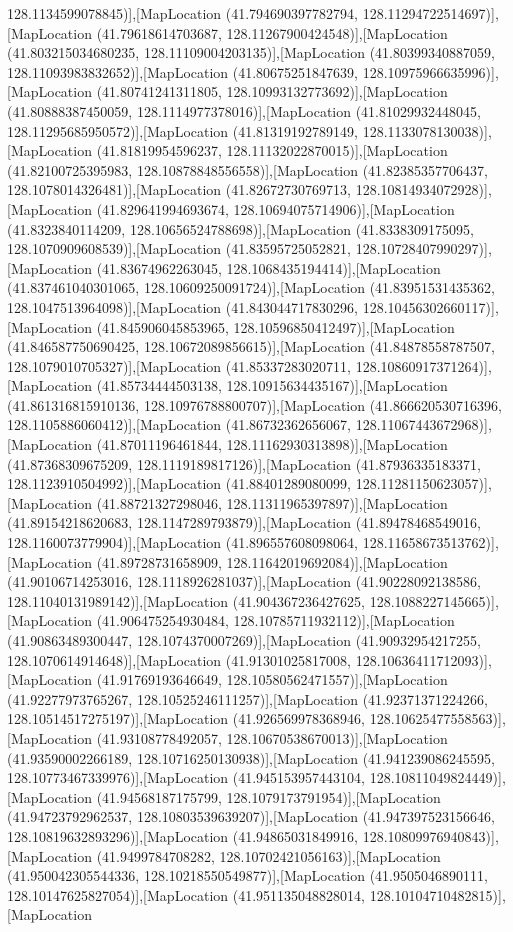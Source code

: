 128.1134599078845)],[MapLocation (41.794690397782794, 128.11294722514697)],[MapLocation (41.79618614703687, 128.11267900424548)],[MapLocation (41.803215034680235, 128.11109004203135)],[MapLocation (41.80399340887059, 128.11093983832652)],[MapLocation (41.80675251847639, 128.10975966635996)],[MapLocation (41.80741241311805, 128.10993132773692)],[MapLocation (41.80888387450059, 128.1114977378016)],[MapLocation (41.81029932448045, 128.11295685950572)],[MapLocation (41.81319192789149, 128.1133078130038)],[MapLocation (41.81819954596237, 128.11132022870015)],[MapLocation (41.82100725395983, 128.10878848556558)],[MapLocation (41.82385357706437, 128.1078014326481)],[MapLocation (41.82672730769713, 128.10814934072928)],[MapLocation (41.829641994693674, 128.10694075714906)],[MapLocation (41.8323840114209, 128.10656524788698)],[MapLocation (41.8338309175095, 128.1070909608539)],[MapLocation (41.83595725052821, 128.10728407990297)],[MapLocation (41.83674962263045, 128.1068435194414)],[MapLocation (41.837461040301065, 128.10609250091724)],[MapLocation (41.83951531435362, 128.1047513964098)],[MapLocation (41.843044717830296, 128.10456302660117)],[MapLocation (41.845906045853965, 128.10596850412497)],[MapLocation (41.846587750690425, 128.10672089856615)],[MapLocation (41.84878558787507, 128.1079010705327)],[MapLocation (41.85337283020711, 128.10860917371264)],[MapLocation (41.85734444503138, 128.10915634435167)],[MapLocation (41.861316815910136, 128.10976788800707)],[MapLocation (41.866620530716396, 128.1105886060412)],[MapLocation (41.86732362656067, 128.11067443672968)],[MapLocation (41.87011196461844, 128.11162930313898)],[MapLocation (41.87368309675209, 128.1119189817126)],[MapLocation (41.87936335183371, 128.1123910504992)],[MapLocation (41.88401289080099, 128.11281150623057)],[MapLocation (41.88721327298046, 128.11311965397897)],[MapLocation (41.89154218620683, 128.1147289793879)],[MapLocation (41.89478468549016, 128.1160073779904)],[MapLocation (41.896557608098064, 128.11658673513762)],[MapLocation (41.89728731658909, 128.11642019692084)],[MapLocation (41.90106714253016, 128.1118926281037)],[MapLocation (41.90228092138586, 128.11040131989142)],[MapLocation (41.904367236427625, 128.1088227145665)],[MapLocation (41.906475254930484, 128.10785711932112)],[MapLocation (41.90863489300447, 128.1074370007269)],[MapLocation (41.90932954217255, 128.1070614914648)],[MapLocation (41.91301025817008, 128.10636411712093)],[MapLocation (41.91769193646649, 128.10580562471557)],[MapLocation (41.92277973765267, 128.10525246111257)],[MapLocation (41.92371371224266, 128.10514517275197)],[MapLocation (41.926569978368946, 128.10625477558563)],[MapLocation (41.93108778492057, 128.10670538670013)],[MapLocation (41.93590002266189, 128.10716250130938)],[MapLocation (41.941239086245595, 128.10773467339976)],[MapLocation (41.945153957443104, 128.10811049824449)],[MapLocation (41.94568187175799, 128.1079173791954)],[MapLocation (41.94723792962537, 128.10803539639207)],[MapLocation (41.947397523156646, 128.10819632893296)],[MapLocation (41.94865031849916, 128.10809976940843)],[MapLocation (41.9499784708282, 128.10702421056163)],[MapLocation (41.950042305544336, 128.10218550549877)],[MapLocation (41.9505046890111, 128.10147625827054)],[MapLocation (41.951135048828014, 128.10104710482815)],[MapLocation 